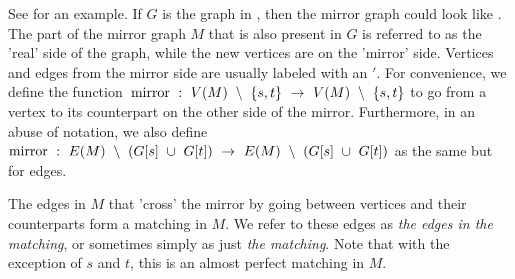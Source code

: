 See  for an example. If $G$ is the graph in , then the mirror graph could look like . The part of the mirror graph $M$ that is also present in $G$ is referred to as the 'real' side of the graph, while the new vertices are on the 'mirror' side. Vertices and edges from the mirror side are usually labeled with an $'$. For convenience, we define the function~$\operatorname{mirror}~:~V(M)~\setminus~\{s,t\}~\rightarrow~V(M)~\setminus~\{s,t\}$ to go from a vertex to its counterpart on the other side of the mirror. Furthermore, in an abuse of notation, we also define~$\operatorname{mirror}~:~E(M)~\setminus~(G[s]~\cup~G[t])~\rightarrow~E(M)~\setminus~(G[s]~\cup~G[t])$ as the same but for edges.

The edges in $M$ that 'cross' the mirror by going between vertices and their counterparts form a matching in $M$. We refer to these edges as \emph{the edges in the matching}, or sometimes simply as just \emph{the matching}. Note that with the exception of $s$ and $t$, this is an almost perfect matching in $M$.

